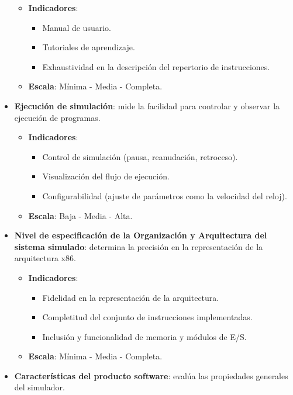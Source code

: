\documentclass[12pt,oneside]{templates/unerthesis}
\providecommand{\tightlist}{%
  \setlength{\itemsep}{0pt}\setlength{\parskip}{0pt}}
\begin{document}
\begin{itemize}
  \begin{itemize}
  \tightlist
  \item
    \textbf{Indicadores}:

    \begin{itemize}
    \tightlist
    \item
      Manual de usuario.
    \item
      Tutoriales de aprendizaje.
    \item
      Exhaustividad en la descripción del repertorio de instrucciones.
    \end{itemize}
  \item
    \textbf{Escala}: Mínima - Media - Completa.
  \end{itemize}
\item
  \textbf{Ejecución de simulación}: mide la facilidad para controlar y observar la ejecución de programas.

  \begin{itemize}
  \tightlist
  \item
    \textbf{Indicadores}:

    \begin{itemize}
    \tightlist
    \item
      Control de simulación (pausa, reanudación, retroceso).
    \item
      Visualización del flujo de ejecución.
    \item
      Configurabilidad (ajuste de parámetros como la velocidad del reloj).
    \end{itemize}
  \item
    \textbf{Escala}: Baja - Media - Alta.
  \end{itemize}
\item
  \textbf{Nivel de especificación de la Organización y Arquitectura del sistema simulado}: determina la precisión en la representación de la arquitectura x86.

  \begin{itemize}
  \tightlist
  \item
    \textbf{Indicadores}:

    \begin{itemize}
    \tightlist
    \item
      Fidelidad en la representación de la arquitectura.
    \item
      Completitud del conjunto de instrucciones implementadas.
    \item
      Inclusión y funcionalidad de memoria y módulos de E/S.
    \end{itemize}
  \item
    \textbf{Escala}: Mínima - Media - Completa.
  \end{itemize}
\item
  \textbf{Características del producto software}: evalúa las propiedades generales del simulador.


\end{itemize}
\end{document}
